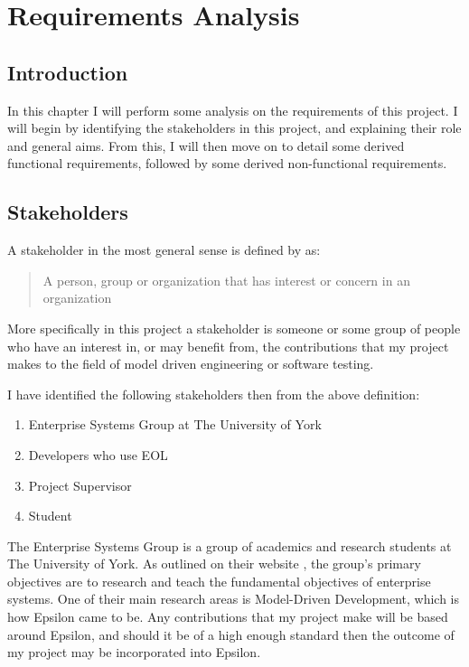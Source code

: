 \chapter{Requirements Analysis}
\label{chap:requirements}

\section{Introduction}

In this chapter I will perform some analysis on the requirements of this project. I will begin by identifying the stakeholders in this project, and explaining their role and general aims. From this, I will then move on to detail some derived functional requirements, followed by some derived non-functional requirements.

\section{Stakeholders}
A stakeholder in the most general sense is defined by \citet{stakeholderDef} as:

\begin{quote}
	A person, group or organization that has interest or concern in an organization
\end{quote}

More specifically in this project a stakeholder is someone or some group of people who have an interest in, or may benefit from, the contributions that my project makes to the field of model driven engineering or software testing.

I have identified the following stakeholders then from the above definition:

\begin{enumerate}
\item Enterprise Systems Group at The University of York
\item Developers who use EOL
\item Project Supervisor
\item Student
\end{enumerate}

The Enterprise Systems Group is a group of academics and research students at The University of York. As outlined on their website \cite{ESG}, the group's primary objectives are to research and teach the fundamental objectives of enterprise systems. One of their main research areas is Model-Driven Development, which is how Epsilon came to be. Any contributions that my project make will be based around Epsilon, and should it be of a high enough standard then the outcome of my project may be incorporated into Epsilon.

